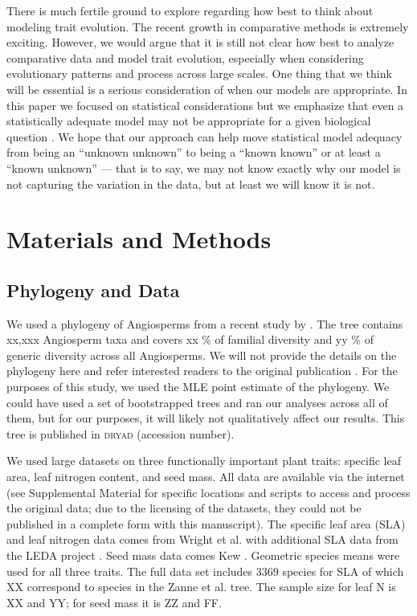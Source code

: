 \documentclass[a4paper,12pt]{article}
\begin{document}
There is much fertile ground to explore regarding how best to think about modeling trait evolution. The recent growth in comparative methods is extremely exciting. However, we would argue that it is still not clear how best to analyze comparative data and model trait evolution, especially when considering evolutionary patterns and process across large scales. One thing that we think will be essential is a serious consideration of when our models are appropriate. In this paper we focused on statistical considerations but we emphasize that even a statistically adequate model may not be appropriate for a given biological question \citep{Hansen2012}. We hope that our approach can help move statistical model adequacy from being an ``unknown unknown''  to being a ``known known'' or at least a ``known unknown'' --- that is to say, we may not know exactly why our model is not capturing the variation in the data, but at least we will know it is not.

\section{Materials and Methods}

\subsection{Phylogeny and Data}
We used a phylogeny of Angiosperms from a recent study by \citet{Zanne2013}. The tree contains xx,xxx Angiosperm taxa and covers xx \% of familial diversity and yy \% of generic diversity across all Angiosperms. We will not provide the details on the phylogeny here and refer interested readers to the original publication \citep{Zanne2013}. For the purposes of this study, we used the MLE point estimate of the phylogeny. We could have used a set of bootstrapped trees and ran our analyses across all of them, but for our purposes, it will likely not qualitatively affect our results. This tree is published in \textsc{dryad} (accession number).

We used large datasets on three functionally important plant traits: specific leaf area, leaf nitrogen content, and seed mass.  All data are available via the internet (see Supplemental Material for specific locations and scripts to access and process the original data; due to the licensing of the datasets, they could not be published in a complete form with this manuscript). The specific leaf area (SLA) and leaf nitrogen data comes from Wright et al. \citep{Wright2004} with additional SLA data from the LEDA project \citep{Kleyer2008}. Seed mass data comes Kew \citep{Kew2008}.  Geometric species means were used for all three traits.  The full data set includes 3369 species for SLA of which XX correspond to species in the Zanne et al. \citep{Zanne2013} tree.  The sample size for leaf N is XX and YY; for seed mass it is ZZ and FF.  
\end{document}
